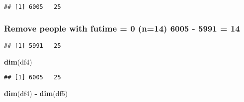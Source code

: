 \documentclass[
]{article}
\newenvironment{Shaded}{\begin{snugshade}}{\end{snugshade}}
\newcommand{\DecValTok}[1]{\textcolor[rgb]{0.00,0.00,0.81}{#1}}
\newcommand{\KeywordTok}[1]{\textcolor[rgb]{0.13,0.29,0.53}{\textbf{#1}}}
\newcommand{\NormalTok}[1]{#1}
\newcommand{\OperatorTok}[1]{\textcolor[rgb]{0.81,0.36,0.00}{\textbf{#1}}}
\newcommand{\StringTok}[1]{\textcolor[rgb]{0.31,0.60,0.02}{#1}}
\begin{document}
\begin{Shaded}
\end{Shaded}

\begin{verbatim}
## [1] 6005   25
\end{verbatim}

\hypertarget{remove-people-with-futime-0-n14-6005---5991-14}{%
\subsubsection{Remove people with futime = 0 (n=14) 6005 - 5991 =
14}\label{remove-people-with-futime-0-n14-6005---5991-14}}

\begin{Shaded}
\end{Shaded}

\begin{verbatim}
## [1] 5991   25
\end{verbatim}

\begin{Shaded}
\begin{Highlighting}[]
\KeywordTok{dim}\NormalTok{(df4)}
\end{Highlighting}
\end{Shaded}

\begin{verbatim}
## [1] 6005   25
\end{verbatim}

\begin{Shaded}
\begin{Highlighting}[]
\KeywordTok{dim}\NormalTok{(df4) }\OperatorTok{-}\StringTok{ }\KeywordTok{dim}\NormalTok{(df5)}
\end{Highlighting}
\end{Shaded}
\end{document}

